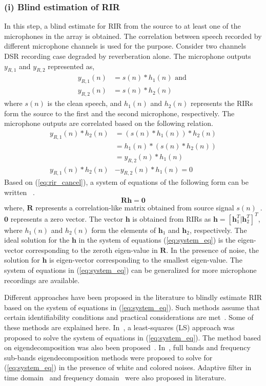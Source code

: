 \subsubsection{(i) Blind estimation of RIR}
\label{sec:MINT}
In this step, a blind estimate for RIR from the source to at least one of the microphones in the array is obtained. The correlation between speech recorded by different microphone channels is used for the purpose. Consider two channels DSR recording case degraded by reverberation alone. The microphone outputs $y_{R,1}$ and $y_{R,2}$ represented as,
\begin{align}
y_{R,1}(n)&=s(n)*h_1(n) \text{  and } \nonumber \\
y_{R,2}(n)&=s(n)*h_2(n)
\end{align}
where $s(n)$ is the clean speech, and $h_1(n)$ and $h_2(n)$ represents the RIRs form the source to the first and the second microphone, respectively. The microphone outputs are correlated based on the following relation.
\begin{align}
y_{R,1}(n)*h_2(n)&=(s(n)*h_1(n))*h_2(n) \nonumber \\
                 &=h_1(n)*(s(n)*h_2(n)) \nonumber \\
                 &=y_{R,2}(n)*h_1(n) \nonumber\\
y_{R,1}(n)*h_2(n)&-y_{R,2}(n)*h_1(n)=0
\label{eq:rir_cancel}
\end{align}
Based on (\ref{eq:rir_cancel}), a system of equations of the following form can be written~ \cite{xu1995least}.
\begin{equation}
\mathbf{Rh}=\mathbf{0}
\label{eq:system_eq}
\end{equation}
where, $\mathbf{R}$ represents a correlation-like matrix obtained from source signal $s(n)$~\cite{huang2003class}. $\mathbf{0}$ represents a zero vector. The vector $\mathbf{h}$ is obtained from RIRs as $\mathbf{h}=[\mathbf{h}_1^T|\mathbf{h}_2^T]^T$, where $h_1(n)$ and $h_2(n)$ form the elements of $\mathbf{h}_1$ and $\mathbf{h}_2$, respectively. The ideal solution for the $\mathbf{h}$ in the system of equations (\ref{eq:system_eq}) is the eigen-vector corresponding to the zeroth eigen-value in $\mathbf{R}$. In the presence of noise, the solution for $\mathbf{h}$ is eigen-vector corresponding to the smallest eigen-value. The system of equations in (\ref{eq:system_eq}) can be generalized for more microphone recordings are available.

Different approaches have been proposed in the literature to blindly estimate RIR based on the system of equations in (\ref{eq:system_eq}). Such methods assume that certain identifiability conditions and practical considerations are met~\cite{naylor2010speech}. Some of these methods are explained here. In~\cite{huang2003class}, a least-squares (LS) approach was proposed to solve the system of equations in (\ref{eq:system_eq}). The method based on eigendecomposition was also been proposed~\cite{gurelli1995evam}. In~\cite{gannot2003subspace}, full bands and frequency sub-bands eigendecomposition methods were proposed to solve for (\ref{eq:system_eq}) in the presence of white and colored noises. Adaptive filter in time domain~\cite{huang2002adaptive}  and frequency domain~\cite{huang2003class} were also proposed in literature.


